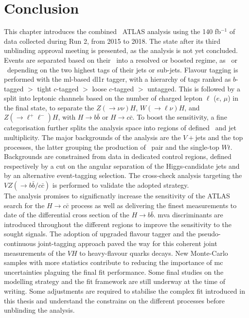 \section{Conclusion}
This chapter introduces the combined \vhbc\ ATLAS analysis using the 140 fb$^{-1}$ of data collected during Run 2, from 2015 to 2018. The state after its third unblinding approval meeting is presented, as the analysis is not yet concluded. Events are separated based on their \ptv\ into a resolved or boosted regime, as \vhb\ or \vhc\ depending on the two highest tags of their jets or sub-jets. Flavour tagging is performed with the \gls{ml}-based \gls{dl1r} tagger, with a hierarchy of tags ranked as $b$-tagged $>$ tight $c$-tagged $>$ loose $c$-tagged $>$ untagged. This is followed by a split into leptonic channels based on the number of charged lepton $\ell$ ($e$, $\mu$) in the final state, to separate the $Z(\rightarrow \nu\nu)H$, $W(\rightarrow \ell\nu)H$, and $Z(\rightarrow \ell^+\ell^-)H$, with $H \rightarrow b\bar{b}$ or $H \rightarrow c\bar{c}$. To boost the sensitivity, a fine categorisation further splits the analysis space into regions of defined \ptv\ and jet multiplicity. The major backgrounds of the analysis are the $V+$jets and the top processes, the latter grouping the production of \ttb\ pair and the single-top $Wt$. Backgrounds are constrained from data in dedicated control regions, defined respectively by a cut on the angular separation of the Higgs-candidate jets and by an alternative event-tagging selection. The cross-check analysis targeting the $VZ (\rightarrow b\bar{b}/c\bar{c})$ is performed to validate the adopted strategy. \\

The analysis promises to significnatly increase the sensitivity of the ATLAS search for the $H\rightarrow c\bar{c}$ process as well as delivering the finest measurements to date of the differential cross section of the $H\rightarrow b\bar{b}$. \gls{mva} discriminants are introduced throughout the different regions to improve the sensitivity to the sought signals. The adoption of upgraded flavour tagger and the pseudo-continuous joint-tagging approach paved the way for this coherent joint measurements of the $VH$ to heavy-flavour quarks decays. New Monte-Carlo samples with more statistics contribute to reducing the importance of \gls{mc} uncertainties plaguing the final fit performance. Some final studies on the modelling strategy and the fit framework are still underway at the time of writing. Some adjustments are required to stabilise the complex fit introduced in this thesis and understand the constrains on the different processes before unblinding the analysis.\\

